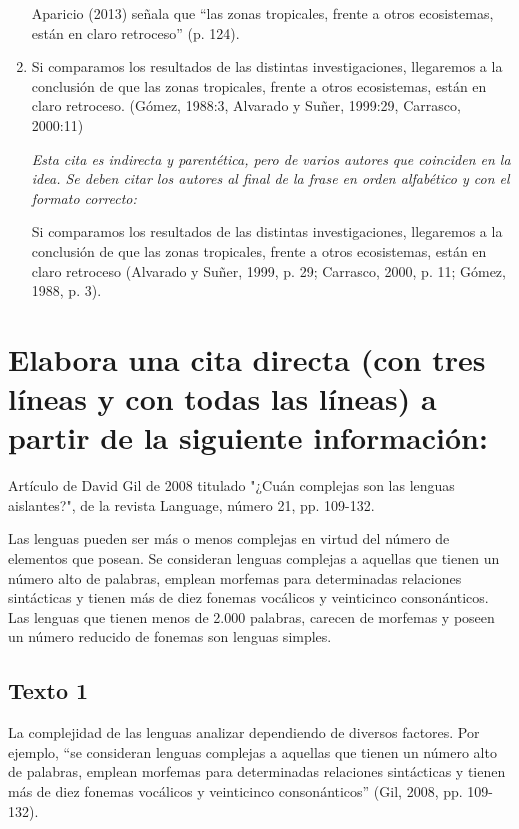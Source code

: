\documentclass[12pt, a4paper, oneside]{report}
\begin{document}
\begin{Large}
\begin{enumerate}
                    Aparicio (2013) señala que ``las zonas tropicales, frente a otros ecosistemas, están en
                    claro retroceso'' (p. 124).
                    \clearpage
                    \item Si comparamos los resultados de las distintas investigaciones, llegaremos a la
                    conclusión de que las zonas tropicales, frente a otros ecosistemas, están en claro retroceso.
                    (Gómez, 1988:3, Alvarado y Suñer, 1999:29, Carrasco, 2000:11)

                    \textit{Esta cita es indirecta y parentética, pero de varios autores que coinciden en la idea.
                    Se deben citar los autores al final de la frase en orden alfabético y con el formato
                    correcto:}

                    Si comparamos los resultados de las distintas investigaciones, llegaremos a la conclusión de
                    que las zonas tropicales, frente a otros ecosistemas, están en claro retroceso
                    (Alvarado y Suñer, 1999, p. 29; Carrasco, 2000, p. 11; Gómez, 1988, p. 3).
                \end{enumerate}
            \end{Large}
            \clearpage

        \section{Elabora una cita directa (con tres líneas y con todas las líneas) a partir de la siguiente
        información:}

            Artículo de David Gil de 2008 titulado "¿Cuán complejas son las lenguas aislantes?", de la revista
            Language, número 21, pp. 109-132.

            Las lenguas pueden ser más o menos complejas en virtud del número de elementos que posean. Se
            consideran lenguas complejas a aquellas que tienen un número alto de palabras, emplean morfemas
            para determinadas relaciones sintácticas y tienen más de diez fonemas vocálicos y veinticinco
            consonánticos. Las lenguas que tienen menos de 2.000 palabras, carecen de morfemas y poseen un
            número reducido de fonemas son lenguas simples.

            \subsection*{Texto 1}
                La complejidad de las lenguas analizar dependiendo de diversos factores. Por ejemplo, ``se
                consideran lenguas complejas a aquellas que tienen un número alto de palabras, emplean
                morfemas para determinadas relaciones sintácticas y tienen más de diez fonemas vocálicos y
                veinticinco consonánticos'' (Gil, 2008, pp. 109-132).
\end{document}
